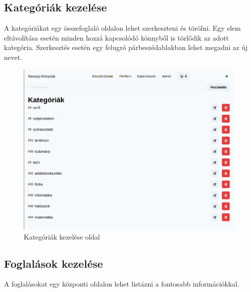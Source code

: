 \subsection{Kategóriák kezelése}

A kategóriákat egy összefoglaló oldalon lehet szerkeszteni és törölni. Egy elem eltávolítása esetén
minden hozzá kapcsolódó könnyből is törlődik az adott kategória. Szerkesztés esetén egy felugró párbeszédablakban lehet
megadni az új nevet.

\begin{figure}[!ht]
  \centering
  \includegraphics[width=150mm, keepaspectratio]{figures/category-admin-list.png}
  \caption{Kategóriák kezelése oldal}
  \label{fig:CategoryAdmin}
\end{figure}

\subsection{Foglalások kezelése}

A foglalásokat egy központi oldalon lehet listázni a fontosabb információkkal.

